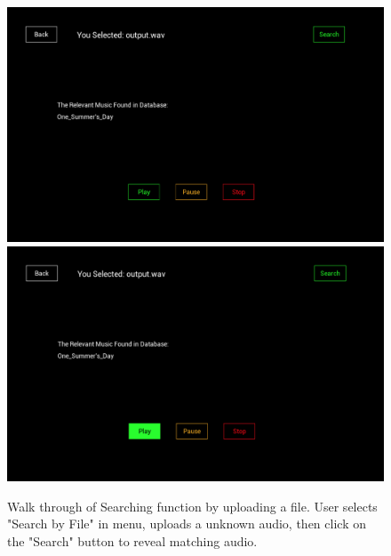 \documentclass[whitelogo,12pt]{tudelft-report}
\begin{document}
\begin{figure}[!htb]
  \includegraphics[width=\linewidth]{sf3}
\endminipage\hfill
{}
  \includegraphics[width=\linewidth]{sf4}
\endminipage\hfill

\caption{Walk through of Searching function by uploading a file. User selects "Search by File" in menu, uploads a unknown audio, then click on the "Search" button to reveal matching audio.}
\label{fig:sf}
\end{figure}
\end{document}
